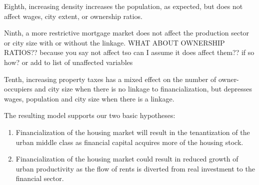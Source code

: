 Eighth, increasing density increases the population, as expected, but does not affect wages, city extent, or ownership ratios.

Ninth, a more restrictive mortgage market does not affect the production sector or city size with or without the linkage. {\color{red} WHAT ABOUT OWNERSHIP RATIOS?? because you say not affect tso can I assume it does affect them?? if so how? or add to list of unaffected variables}

Tenth, increasing property taxes has a mixed effect on the number of owner-occupiers and city size when there is no linkage to financialization, but depresses wages, population and city size when there is a linkage. 



The resulting model supports our two basic hypotheses:
\begin{enumerate}
    \item Financialization of the housing market will result in the tenantization of the urban middle class as financial capital acquires more of the housing stock. %
    \item Financialization of the housing market could result in reduced growth of urban productivity as the flow of rents is diverted from real investment to the financial sector.
\end{enumerate} 



